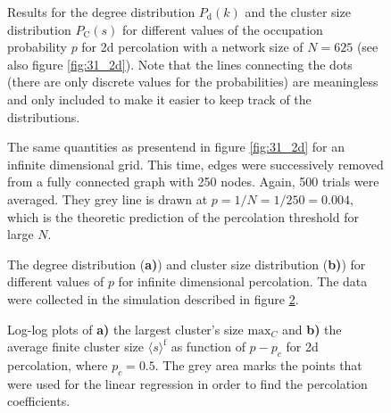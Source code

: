 \documentclass{scrartcl}
\begin{document}
\begin{figure}
    \caption{Results for the degree distribution $P_\mathrm{d}(k)$ and the
        cluster size distribution $P_\mathrm{C}(s)$ for different
        values of the occupation probability $p$ for 2d percolation with
        a network size of $N=625$ (see also figure \ref{fig:31_2d}). Note that the
        lines connecting the dots (there are only discrete values for the
        probabilities) are meaningless and only included to make it easier to
        keep track of the distributions.}
    \label{fig:31_2d_dist}
\end{figure}

\begin{figure}
    \caption{The same quantities as presentend in figure \ref{fig:31_2d}
        for an infinite dimensional grid. This time, edges were successively
        removed from a fully connected graph with 250 nodes. Again, 500 trials were
        averaged. They grey line is drawn at $p=1/N=1/250=0.004$, which is the theoretic prediction
        of the percolation threshold for large $N$.}
    \label{fig:31_infty}
\end{figure}

\begin{figure}
    \caption{The degree distribution (\textbf{a)}) and cluster size
        distribution (\textbf{b)}) for different values of $p$ for infinite
        dimensional percolation. The data were collected in the simulation
        described in figure \ref{fig:31_infty}.}
    \label{fig:31_infty_dist}
\end{figure}

\begin{figure}
    \caption{Log-log plots of \textbf{a)} the largest cluster's size
        $\mathrm{max}_C$ and \textbf{b)} the average finite cluster size
        $\langle s\rangle^\mathrm{f}$ as function of $p-p_c$ for 2d
        percolation, where $p_c=0.5$. The grey area marks the points that were
        used for the linear regression in order to find the percolation
        coefficients.}
    \label{fig:32_2d}
\end{figure}
\end{document}
